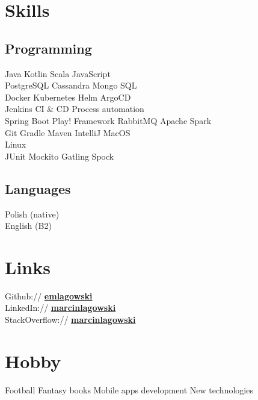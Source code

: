 
\section{Skills}
\subsection{Programming}
Java \textbullet{}
Kotlin \textbullet{}
Scala \textbullet{}
JavaScript \\
PostgreSQL \textbullet{}   
Cassandra \textbullet{} 
Mongo \textbullet{} 
SQL \\
Docker \textbullet{} 
Kubernetes \textbullet{}
Helm \textbullet{}  
ArgoCD \\ 
Jenkins \textbullet{} 
CI \& CD Process automation\\
Spring Boot \textbullet{} 
Play! Framework \textbullet{} 
RabbitMQ \textbullet{} 
Apache Spark \\
Git \textbullet{} 
Gradle \textbullet{} 
Maven \textbullet{}
IntelliJ \textbullet{}
MacOS \\
Linux \\
JUnit \textbullet{} 
Mockito \textbullet{} 
Gatling \textbullet{} 
Spock \\
\sectionsep
\subsection{Languages}
Polish (native) \\
English (B2)
\sectionsep


\section{Links} 
Github:// \href{https://github.com/emlagowski}{\textbf{emlagowski}} \\
LinkedIn://  \href{https://www.linkedin.com/in/marcinlagowski}{\textbf{marcinlagowski}} \\
StackOverflow://  \href{http://stackoverflow.com/users/3233685/marcin-lagowski}{\textbf{marcinlagowski}} 
\sectionsep


\section{Hobby}
Football \textbullet{}   
Fantasy books \textbullet{} 
Mobile apps development \textbullet{} 
New technologies \\

%
%
